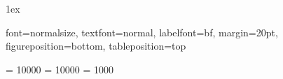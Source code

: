 \usepackage[left=1.8in, right=1.2in, top=1.5in, bottom=0.95in, includefoot, headheight=13.6pt]{geometry}

\parindent 0pt
\parskip 1ex

\usepackage{caption}
{
  font={normalsize}, textfont={normal}, labelfont={bf}, margin=20pt, figureposition=bottom, tableposition=top
}

\captionsetup{style=normal}
\setlength{\abovecaptionskip}{0pt}

\usepackage[figure,table]{hypcap} %
\makeatletter
\newcommand\org@hypertarget{}
\let\org@hypertarget\hypertarget
\renewcommand\hypertarget[2]{%
\Hy@raisedlink{\org@hypertarget{#1}{}}#2%
} \makeatother

\clubpenalty = 10000
\widowpenalty = 10000 \displaywidowpenalty = 1000

\usepackage[utf8]{inputenc}

\usepackage[T1]{fontenc} 

\usepackage[german,english]{babel}

\usepackage[toc,page]{appendix}

\usepackage[pdftex]{graphicx}

\usepackage{color}

\usepackage{caption}
\usepackage{subcaption}
\usepackage{floatrow}
\usepackage{sidecap}
\usepackage{float}
\usepackage{tikz}

\usepackage[countmax]{subfloat}

\usepackage{tabularx}
\usepackage{longtable}
\usepackage{ltxtable}

\usepackage{multirow}

